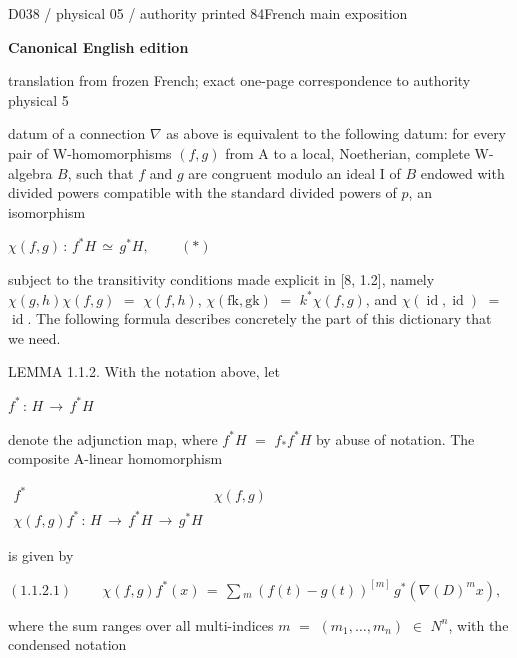 \documentclass[9pt]{article}
\newcommand{\CanonText}[1]{\par{\fontsize{8.0}{9.35}\selectfont\RaggedRight #1\par}\vspace{2.2pt}}
\newcommand{\CanonDisplay}[1]{\par\vspace{1.2pt}\begin{center}{\fontsize{7.2}{8.4}\selectfont\(\displaystyle #1\)}\end{center}\vspace{1.2pt}}
\newenvironment{CanonMathBlock}{\par\vspace{1.2pt}\begin{center}\fontsize{6.8}{8.0}\selectfont\(\displaystyle}{\)\end{center}\vspace{1.2pt}}
\newcommand{\LayerTitle}{Canonical English edition}
\begin{document}
\newpage
\noindent\begin{minipage}[t][\dimexpr\textheight-5pt\relax][t]{\textwidth}
{\sffamily\fontsize{7.3}{8.2}\selectfont\color{Quiet} D038 / physical 05 / authority printed 84\hfill French main exposition}
\par{}\vspace{4.5pt}
{\sffamily\fontsize{10.4}{11.6}\selectfont\bfseries\color{Accent} \LayerTitle}
\par{\sffamily\fontsize{6.7}{7.7}\selectfont\color{Quiet} translation from frozen French; exact one-page correspondence to authority physical 5}
\vspace{5pt}
\CanonText{datum of a connection \(\nabla{}\) as above is equivalent to the following datum: for every pair of W-homomorphisms \((f,g)\) from A to a local, Noetherian, complete W-algebra \(B\), such that \(f\) and \(g\) are congruent modulo an ideal I of \(B\) endowed with divided powers compatible with the standard divided powers of \(p\), an isomorphism}
\CanonDisplay{\chi{}(f,g)\,:\,f^{*}H\,\simeq{}\,g^{*}H,\qquad\,(*)}
\CanonText{subject to the transitivity conditions made explicit in [8, 1.2], namely \(\chi{}(g,h)\chi{}(f,g)\) \(=\) \(\chi{}(f,h)\), \(\chi{}(\text{fk},\text{gk})\) \(=\) \(k^{*}\chi{}(f,g)\), and \(\chi{}(\operatorname{id},\operatorname{id})\) \(=\) \(\operatorname{id}\). The following formula describes concretely the part of this dictionary that we need.}
\CanonText{LEMMA 1.1.2. With the notation above, let}
\CanonDisplay{f^{*}\,:\,H\,\to{}\,f^{*}H}
\CanonText{denote the adjunction map, where \(f^{*}H\) \(=\) \(f_*f^{*}H\) by abuse of notation. The composite A-linear homomorphism}
\begin{CanonMathBlock}
\begin{array}{cc}
f^{*} & \chi{}(f,g)\\
\chi{}(f,g)f^{*}\,:\,H\,\longrightarrow{}\,f^{*}H\,\longrightarrow{}\,g^{*}H & {}
\end{array}
\end{CanonMathBlock}
\CanonText{is given by}
\CanonDisplay{(1.1.2.1)\qquad\,\chi{}(f,g)f^{*}(x)\,=\,\sum{}_{m}\,(f(t)-g(t))^{[m]}\,g^{*}(\nabla{}(D)^{m}x),}
\CanonText{where the sum ranges over all multi-indices \(m\) \(=\) \((m_{1},\ldots{},m_{n})\) \(\in{}\) \(N^{n}\), with the condensed notation}

\end{minipage}
\end{document}
